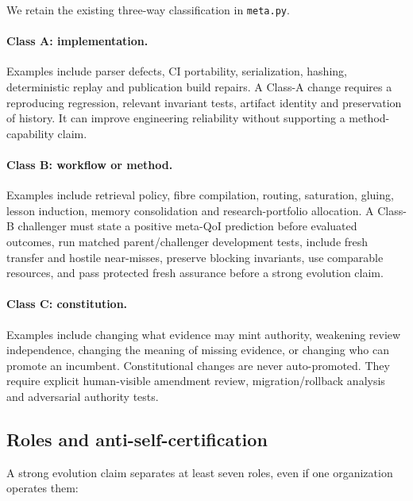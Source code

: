 We retain the existing three-way classification in \texttt{meta.py}.

\paragraph{Class A: implementation.}
Examples include parser defects, CI portability, serialization, hashing, deterministic replay and publication build repairs. A Class-A change requires a reproducing regression, relevant invariant tests, artifact identity and preservation of history. It can improve engineering reliability without supporting a method-capability claim.

\paragraph{Class B: workflow or method.}
Examples include retrieval policy, fibre compilation, routing, saturation, gluing, lesson induction, memory consolidation and research-portfolio allocation. A Class-B challenger must state a positive meta-QoI prediction before evaluated outcomes, run matched parent/challenger development tests, include fresh transfer and hostile near-misses, preserve blocking invariants, use comparable resources, and pass protected fresh assurance before a strong evolution claim.

\paragraph{Class C: constitution.}
Examples include changing what evidence may mint authority, weakening review independence, changing the meaning of missing evidence, or changing who can promote an incumbent. Constitutional changes are never auto-promoted. They require explicit human-visible amendment review, migration/rollback analysis and adversarial authority tests.

\subsection{Roles and anti-self-certification}

A strong evolution claim separates at least seven roles, even if one organization operates them:

